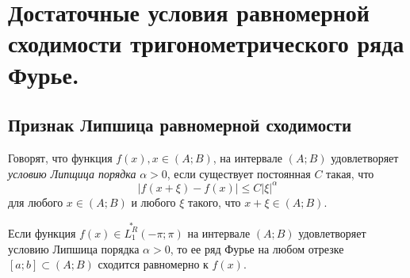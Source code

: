 \chapter{Достаточные условия равномерной сходимости тригонометрического ряда Фурье.}

\section{Признак Липшица равномерной сходимости}
Говорят, что функция $f(x), x \in (A;B)$, на интервале $(A;B)$ удовлетворяет \textit{условию Липщица порядка} $\alpha > 0$, если существует постоянная $C$ такая, что
$$
|f(x+\xi) - f(x)| \le C|\xi|^{\alpha}
$$
для любого $x \in (A;B)$ и любого $\xi$ такого, что $x + \xi \in (A;B)$.

\begin{thm}  \label{ch18thm1}
Если функция $f(x) \in \overset{*}{L^{R}_1}(-\pi;\pi)$ на интервале $(A;B)$ удовлетворяет условию Липшица порядка $\alpha > 0$, то ее ряд Фурье на любом отрезке $[a;b] \subset (A;B)$ сходится равномерно к $f(x)$.
\end{thm}
